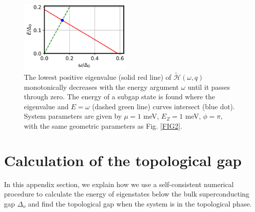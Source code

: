 \documentclass[twocolumn,aps,prb,nofootinbib]{revtex4-2}
\begin{document}
\begin{figure}[t]
\begin{center}
\includegraphics[width=0.48\textwidth]{Fig17_Appendix_C.png}
\end{center}
\vspace{-0.5cm}
\caption{The lowest positive eigenvalue (solid red line) of $\widetilde{\mathcal{H}}(\omega,q)$ monotonically decreases with the energy argument $\omega$ until it passes through zero. The energy of a subgap state is found where the eigenvalue and $E = \omega$ (dashed green line) curves intersect (blue dot). System parameters are given by $\mu = 1$ meV, $E_Z = 1$ meV, $\phi = \pi$, with the same geometric parameters as Fig. \ref{FIG2}.}
\label{FIG17A}
\vspace{-1mm}
\end{figure}

\section{Calculation of the topological gap} \label{Iter}

In this appendix section, we explain how we use a self-consistent numerical procedure to calculate the energy of eigenstates below the bulk superconducting gap $\Delta_o$ and find the topological gap when the system is in the topological phase. 
\end{document}
